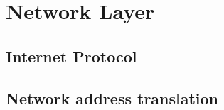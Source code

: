 \section{Network Layer}
\lipsum[1]
\subsection{Internet Protocol}
\lipsum[7-8]
\subsection{Network address translation}
\lipsum[9-10]